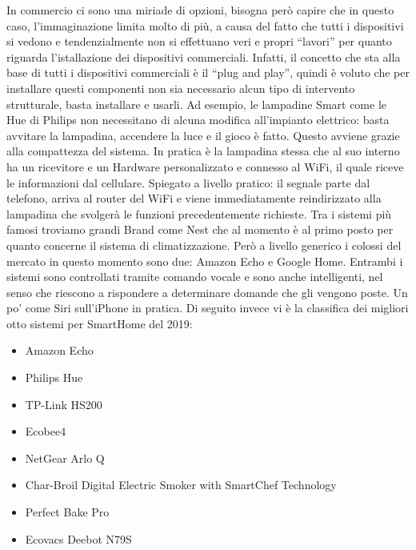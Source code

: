 In commercio ci sono una miriade di opzioni, bisogna però capire che in questo caso, l’immaginazione limita molto di più, a causa del fatto che tutti i dispositivi si vedono e tendenzialmente non si effettuano veri e propri “lavori” per quanto riguarda l’istallazione dei dispositivi commerciali. 
Infatti, il concetto che sta alla base di tutti i dispositivi commerciali è il “plug and play”, quindi è voluto che per installare questi componenti non sia necessario alcun tipo di intervento strutturale, basta installare e usarli. 
Ad esempio, le lampadine Smart come le Hue di Philips non necessitano di alcuna modifica all’impianto elettrico: basta avvitare la lampadina, accendere la luce e il gioco è fatto. Questo avviene grazie alla compattezza del sistema. In pratica è la lampadina stessa che al suo interno ha un ricevitore e un Hardware personalizzato e connesso al WiFi, il quale riceve le informazioni dal cellulare. 
Spiegato a livello pratico: il segnale parte dal telefono, arriva al router del WiFi e viene immediatamente reindirizzato alla lampadina che svolgerà le funzioni precedentemente richieste. 
Tra i sistemi più famosi troviamo grandi Brand come Nest che al momento è al primo posto per quanto concerne il sistema di climatizzazione. Però a livello generico i colossi del mercato in questo momento sono due: Amazon Echo e Google Home. Entrambi i sistemi sono controllati tramite comando vocale e sono anche intelligenti, nel senso che riescono a rispondere a determinare domande che gli vengono poste. Un po’ come Siri sull’iPhone in pratica. Di seguito invece vi è la classifica dei migliori otto sistemi  per SmartHome del 2019:
\begin{itemize}
    \item{Amazon Echo}
    \item{Philips Hue}
    \item{TP-Link HS200}
    \item{Ecobee4}
    \item{NetGear Arlo Q}
    \item{Char-Broil Digital Electric Smoker with SmartChef Technology}
    \item{Perfect Bake Pro}
    \item{Ecovacs Deebot N79S}
\end{itemize}
